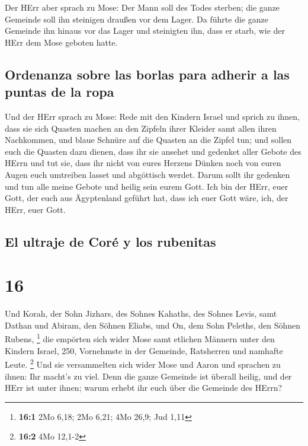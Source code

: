  Der HErr aber sprach zu Mose: Der Mann soll des Todes
sterben; die ganze Gemeinde soll ihn steinigen draußen vor dem Lager.
 Da führte die ganze Gemeinde ihn hinaus vor das Lager
und steinigten ihn, dass er starb, wie der HErr dem Mose geboten hatte.

\hypertarget{ordenanza-sobre-las-borlas-para-adherir-a-las-puntas-de-la-ropa}{%
\subsection{Ordenanza sobre las borlas para adherir a las puntas de la
ropa}\label{ordenanza-sobre-las-borlas-para-adherir-a-las-puntas-de-la-ropa}}

 Und der HErr sprach zu Mose:  Rede mit
den Kindern Israel und sprich zu ihnen, dass sie sich Quasten machen an
den Zipfeln ihrer Kleider samt allen ihren Nachkommen, und blaue Schnüre
auf die Quasten an die Zipfel tun;  und sollen euch die
Quasten dazu dienen, dass ihr sie ansehet und gedenket aller Gebote des
HErrn und tut sie, dass ihr nicht von eures Herzens Dünken noch von
euren Augen euch umtreiben lasset und abgöttisch werdet. 
Darum sollt ihr gedenken und tun alle meine Gebote und heilig sein eurem
Gott.  Ich bin der HErr, euer Gott, der euch aus
Ägyptenland geführt hat, dass ich euer Gott wäre, ich, der HErr, euer
Gott.

\hypertarget{el-ultraje-de-coruxe9-y-los-rubenitas}{%
\subsection{El ultraje de Coré y los
rubenitas}\label{el-ultraje-de-coruxe9-y-los-rubenitas}}

\hypertarget{section-15}{%
\section{16}\label{section-15}}

 Und Korah, der Sohn Jizhars, des Sohnes Kahaths, des
Sohnes Levis, samt Dathan und Abiram, den Söhnen Eliabs, und On, dem
Sohn Peleths, den Söhnen Rubens, \footnote{\textbf{16:1} 2Mo 6,18; 2Mo
  6,21; 4Mo 26,9; Jud 1,11}  die empörten sich wider Mose
samt etlichen Männern unter den Kindern Israel, 250, Vornehmste in der
Gemeinde, Ratsherren und namhafte Leute. \footnote{\textbf{16:2} 4Mo
  12,1-2}  Und sie versammelten sich wider Mose und Aaron
und sprachen zu ihnen: Ihr macht's zu viel. Denn die ganze Gemeinde ist
überall heilig, und der HErr ist unter ihnen; warum erhebt ihr euch über
die Gemeinde des HErrn?

